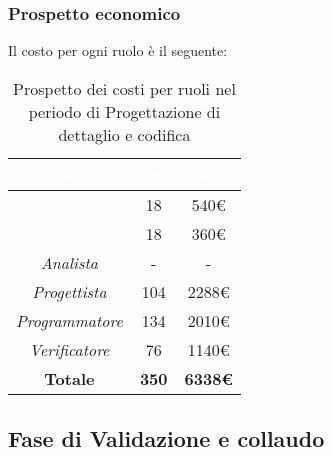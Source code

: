 \subsubsection{Prospetto economico}
Il costo per ogni ruolo è il seguente:
\begin{table}[H]
	\begin{center}
		\begin{tabular}{ |c c c| }
		\rowcolor{darkblue} 
		\textcolor{white}{\textbf{Ruolo}} & \textcolor{white}{\textbf{Ore}} & \textcolor{white}{\textbf{Costo}} \\ \hline
		\textit{\Responsabile} 	& 18 	& 540€ \\ \hline
		\textit{\Amministratore} 	& 18 	& 360€ \\ \hline
		\textit{Analista} 		& - 	& - \\ \hline
		\textit{Progettista} 	& 104 	& 2288€ \\ \hline
		\textit{Programmatore}  	& 134 	& 2010€ \\ \hline
		\textit{Verificatore} 	& 76 	& 1140€ \\ \hline
		\textbf{Totale} & \textbf{350} & \textbf{6338€} \\ \hline
		\end{tabular}
	\caption{ Prospetto dei costi per ruoli nel periodo di Progettazione di dettaglio e codifica}
	\end{center}
\end{table}

\subsection{Fase di Validazione e collaudo}

